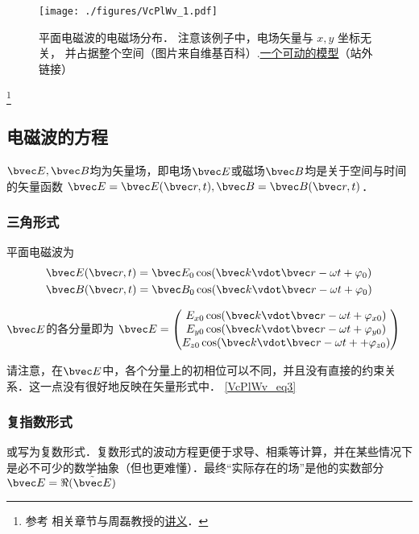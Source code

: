 

\begin{figure}[ht]
\centering
\texttt{[image: ./figures/VcPlWv\_1.pdf]}
\caption{平面电磁波的电磁场分布． 注意该例子中，电场矢量与 $x, y$ 坐标无关， 并占据整个空间（图片来自维基百科）.\href{https://www.geogebra.org/m/xhYwXSsH}{一个可动的模型}（站外链接）} \label{VcPlWv_fig1}
\end{figure}

\footnote{参考 \cite{GriffE} 相关章节与周磊教授的\href{http://fdjpkc.fudan.edu.cn/d200927/2009/0314/c8569a14801/page.htm}{讲义}．}


\subsection{电磁波的方程}
$\bvec E, \bvec B$均为矢量场，即电场$\bvec E$或磁场$\bvec B$均是关于空间与时间的矢量函数 $\bvec E = \bvec E(\bvec r, t), \bvec B = \bvec B(\bvec r, t)$．
\subsubsection{三角形式}
平面电磁波为
\begin{align}\label{VcPlWv_eq3}
&\bvec E(\bvec r, t) = \bvec E_0 \cos(\bvec k\vdot \bvec r - \omega t + \varphi_0)\\
&\bvec B(\bvec r, t) = \bvec B_0 \cos(\bvec k \vdot \bvec r - \omega t + \varphi_0)
\end{align}

$\bvec E$的各分量即为
$\bvec E = 
\begin{pmatrix}
E_{x0} \cos(\bvec k\vdot \bvec r - \omega t+ \varphi_{x0})\\
E_{y0} \cos(\bvec k\vdot \bvec r - \omega t+ \varphi_{y0})\\
E_{z0} \cos(\bvec k\vdot \bvec r - \omega t++ \varphi_{z0})\\
\end{pmatrix}
$

请注意，在$\bvec E$中，各个分量上的初相位可以不同，并且没有直接的约束关系．这一点没有很好地反映在矢量形式中．
\autoref{VcPlWv_eq3} 

\subsubsection{复指数形式}
或写为复数形式．复数形式的波动方程更便于求导、相乘等计算，并在某些情况下是必不可少的数学抽象（但也更难懂）．最终“实际存在的场”是他的实数部分 $\bvec E = \Re (\tilde {\bvec E})$

